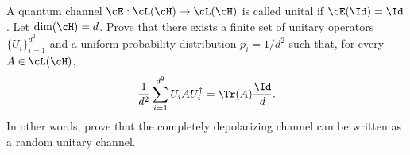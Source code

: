 A quantum channel $\cE:\cL(\cH)\to \cL(\cH)$ is called unital if $\cE(\Id)=\Id$. Let $\dim(\cH)=d$. Prove that there exists a finite set of unitary operators $\{U_i\}_{i=1}^{d^2}$ and a uniform probability distribution $p_i=1/d^2$ such that, for every $A\in \cL(\cH)$,
$$
\frac{1}{d^2}\sum_{i=1}^{d^2} U_i A U_i^\dagger
=
\Tr(A)\frac{\Id}{d}.
$$
In other words, prove that the completely depolarizing channel can be written as a random unitary channel.
